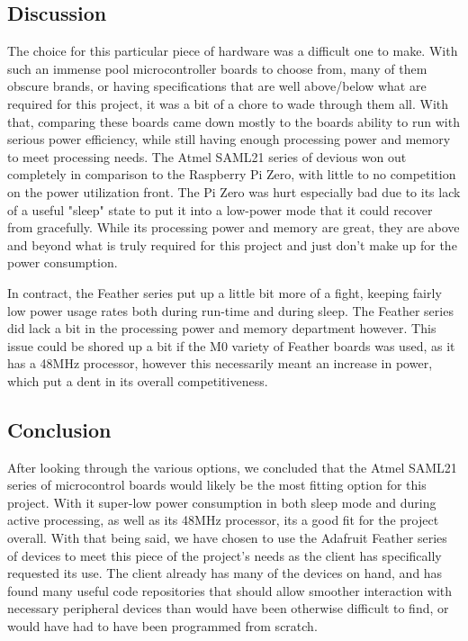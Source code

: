 \documentclass[onecolumn, draftclsnofoot,10pt, compsoc]{IEEEtran}
\begin{document}
    \subsection{Discussion}
	The choice for this particular piece of hardware was a difficult one to make.
    With such an immense pool microcontroller boards to choose from, many of them obscure brands, or having specifications that are well above/below what are required for this project, it was a bit of a chore to wade through them all.
    With that, comparing these boards came down mostly to the boards ability to run with serious power efficiency, while still having enough processing power and memory to meet processing needs.
    The Atmel SAML21 series of devious won out completely in comparison to the Raspberry Pi Zero, with little to no competition on the power utilization front.
    The Pi Zero was hurt especially bad due to its lack of a useful "sleep" state to put it into a low-power mode that it could recover from gracefully.
    While its processing power and memory are great, they are above and beyond what is truly required for this project and just don't make up for the power consumption.\par
    In contract, the Feather series put up a little bit more of a fight, keeping fairly low power usage rates both during run-time and during sleep.
    The Feather series did lack a bit in the processing power and memory department however.
    This issue could be shored up a bit if the M0 variety of Feather boards was used, as it has a 48MHz processor, however this necessarily meant an increase in power, which put a dent in its overall competitiveness.   
    
    \subsection{Conclusion}
    After looking through the various options, we concluded that the Atmel SAML21 series of microcontrol boards would likely be the most fitting option for this project. With it super-low power consumption in both sleep mode and during active processing, as well as its 48MHz processor, its a good fit for the project overall.
    With that being said, we have chosen to use the Adafruit Feather series of devices to meet this piece of the project's needs as the client has specifically requested its use. The client already has many of the devices on hand, and has found many useful code repositories that should allow smoother interaction with necessary peripheral devices than would have been otherwise difficult to find, or would have had to have been programmed from scratch.
    
\end{document}
